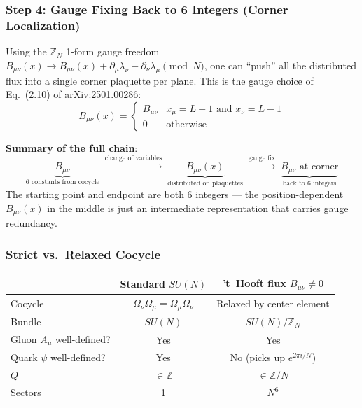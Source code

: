 \documentclass[12pt,a4paper]{article}
\begin{document}
\subsubsection*{Step 4: Gauge Fixing Back to 6 Integers (Corner Localization)}

Using the $\mathbb{Z}_N$ 1-form gauge freedom
$B_{\mu\nu}(x) \to B_{\mu\nu}(x) + \partial_\mu\lambda_\nu - \partial_\nu\lambda_\mu \pmod{N}$,
one can ``push'' all the distributed flux into a single corner plaquette per plane.
This is the gauge choice of Eq.~(2.10) of arXiv:2501.00286:
\begin{equation}
  B_{\mu\nu}(x) = \begin{cases}
    B_{\mu\nu} & x_\mu = L{-}1 \text{ and } x_\nu = L{-}1 \\
    0 & \text{otherwise}
  \end{cases}
\end{equation}

\textbf{Summary of the full chain}:
$$\underbrace{B_{\mu\nu}}_{\text{6 constants from cocycle}}
  \;\xrightarrow{\text{change of variables}}\;
  \underbrace{B_{\mu\nu}(x)}_{\text{distributed on plaquettes}}
  \;\xrightarrow{\text{gauge fix}}\;
  \underbrace{B_{\mu\nu}\text{ at corner}}_{\text{back to 6 integers}}$$
The starting point and endpoint are both 6 integers ---
the position-dependent $B_{\mu\nu}(x)$ in the middle is just an intermediate
representation that carries gauge redundancy.

\subsubsection*{Strict vs.\ Relaxed Cocycle}

\begin{table}[H]
\centering
\begin{tabular}{|l|c|c|}
\hline
 & Standard $SU(N)$ & 't~Hooft flux $B_{\mu\nu}\neq 0$ \\
\hline
Cocycle & $\Omega_\nu\Omega_\mu=\Omega_\mu\Omega_\nu$ & Relaxed by center element \\
Bundle & $SU(N)$ & $SU(N)/\mathbb{Z}_N$ \\
Gluon $A_\mu$ well-defined? & Yes & Yes \\
Quark $\psi$ well-defined? & Yes & No (picks up $e^{2\pi i/N}$) \\
$Q$ & $\in\mathbb{Z}$ & $\in\mathbb{Z}/N$ \\
Sectors & 1 & $N^6$ \\
\hline
\end{tabular}
\end{table}
\end{document}
